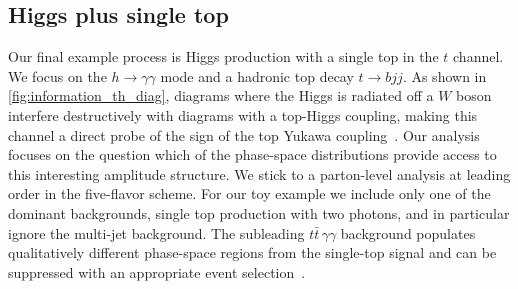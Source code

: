 \subsection{Higgs plus single top}
\label{sec:information_th}

Our final example process
is Higgs production with a single top in the $t$ channel. We focus on
the $h \to \gamma \gamma$ mode and a hadronic top decay $t \to b
jj$.
As shown in \autoref{fig:information_th_diag}, diagrams where the
Higgs is radiated off a $W$ boson interfere destructively with
diagrams with a top-Higgs coupling, making this channel a direct probe
of the sign of the top Yukawa coupling~\cite{Maltoni:2001hu}. Our
analysis focuses on the question which of the phase-space
distributions provide access to this interesting amplitude
structure. We stick to a parton-level analysis at leading order in the
five-flavor scheme. For our toy example we include only one of the
dominant backgrounds, single top production with two photons, and in
particular ignore the multi-jet background. The subleading
$t\bar{t} \, \gamma\gamma$ background populates qualitatively
different phase-space regions from the single-top signal and can be
suppressed with an appropriate event selection~\cite{Kling:2012up}.

